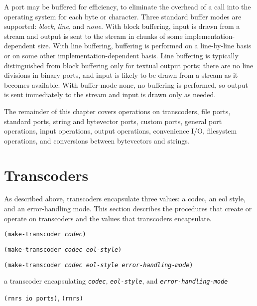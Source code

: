 \label{io_s16}\label{io_s17}\label{io_s18}A port may be buffered for efficiency, to eliminate the overhead of a call
into the operating system for each byte or character.
Three standard buffer modes are supported: \textit{block}, \textit{line},
and \textit{none}.
With block buffering, input is drawn from a stream and output is sent to
the stream in chunks of some implementation-dependent size.
With line buffering, buffering is performed on a line-by-line basis or on
some other implementation-dependent basis.
Line buffering is typically distinguished from block buffering only for
textual output ports; there are no line divisions in binary ports, and
input is likely to be drawn from a stream as it becomes available.
With buffer-mode none, no buffering is performed, so output is sent
immediately to the stream and input is drawn only as needed.


The remainder of this chapter covers operations on transcoders,
file ports, standard ports, string and bytevector ports, custom ports,
general port operations, input operations, output operations,
convenience I/O, filesystem operations, and conversions between
bytevectors and strings.


\section{\label{io_g122}\label{io_h1}Transcoders\label{io_SECTTRANSCODERS}}



As described above, transcoders encapsulate three values: a codec, an eol
style, and an error-handling mode.
This section describes the procedures that create or operate on
transcoders and the values that transcoders encapsulate.

\begin{description}

\label{io_s19}\item[procedure] \texttt{(make-transcoder \textit{codec})}



\item[procedure] \texttt{(make-transcoder \textit{codec} \textit{eol-style})}



\item[procedure] \texttt{(make-transcoder \textit{codec} \textit{eol-style} \textit{error-handling-mode})}



\item[returns] a transcoder encapsulating \texttt{\textit{codec}}, \texttt{\textit{eol-style}}, and \texttt{\textit{error-handling-mode}}


\item[libraries] \texttt{(rnrs io ports)}, \texttt{(rnrs)}
\end{description}

